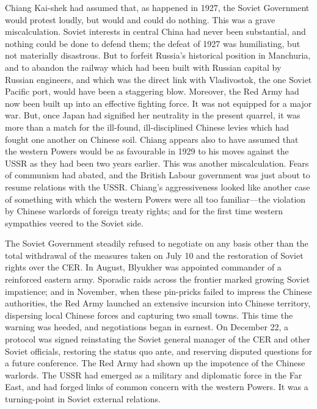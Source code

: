 Chiang Kai-shek had assumed that, as happened in 1927, the Soviet Government would protest loudly, but would and could do nothing. This was a grave miscalculation. Soviet interests in central China had never been substantial, and nothing could be done to defend them; the defeat of 1927 was humiliating, but not materially disastrous. But to forfeit Russia's historical position in Manchuria, and to abandon the railway which had been built with Russian capital by Russian engineers, and which was the direct link with Vladivostok, the one Soviet Pacific port, would have been a staggering blow. Moreover, the Red Army had now been built up into an effective fighting force. It was not equipped for a major war. But, once Japan had signified her neutrality in the present quarrel, it was more than a match for the ill-found, ill-disciplined Chinese levies which had fought one another on Chinese soil. Chiang appears also to have assumed that the western Powers would be as favourable in 1929 to his moves against the USSR as they had been two years earlier. This was another miscalculation. Fears of communism had abated, and the British Labour government was just about to resume relations with the USSR. Chiang's aggressiveness looked like another case of something with which the western Powers were all too familiar---the violation by Chinese warlords of foreign treaty rights; and for the first time western sympathies veered to the Soviet side. 

The Soviet Government steadily refused to negotiate on any basis other than the total withdrawal of the measures taken on July 10 and the restoration of Soviet rights over the CER. In August, Blyukher was appointed commander of a reinforced eastern army. Sporadic raids across the frontier marked growing Soviet impatience; and in November, when these pin-pricks failed to impress the Chinese authorities, the Red Army launched an extensive incursion into Chinese territory, dispersing local Chinese forces and capturing two small towns. This time the warning was heeded, and negotiations began in earnest. On December 22, a protocol was signed reinstating the Soviet general manager of the CER and other Soviet officials, restoring the status quo ante, and reserving disputed questions for a future conference. The Red Army had shown up the impotence of the Chinese warlords. The USSR had emerged as a military and diplomatic force in the Far East, and had forged links of common concern with the western Powers. It was a turning-point in Soviet external relations. 

